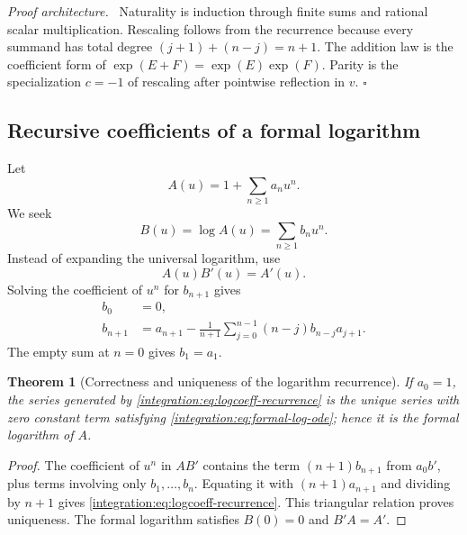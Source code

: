 \documentclass[11pt,oneside]{article}
\newtheorem{theorem}{Theorem}[section]
\theoremstyle{definition}
\theoremstyle{remark}
\newenvironment{proofidea}{\par\smallskip\noindent\textit{Proof architecture.}\ }{\hfill$\square$\par\smallskip}
\begin{document}
\begin{proofidea}
Naturality is induction through finite sums and rational scalar multiplication.
Rescaling follows from the recurrence because every summand has total degree
$(j+1)+(n-j)=n+1$.  The addition law is the coefficient form of
$\exp(E+F)=\exp(E)\exp(F)$.  Parity is the specialization $c=-1$ of rescaling after
pointwise reflection in $v$.
\end{proofidea}

\subsection{Recursive coefficients of a formal logarithm}
\label{integration:sec:log-coeff}

Let
\begin{equation}
 A(u)=1+\sum_{n\ge1}a_nu^n.
 \label{integration:eq:unit-mass-series}
\end{equation}
We seek
\begin{equation}
 B(u)=\log A(u)=\sum_{n\ge1}b_nu^n.
 \label{integration:eq:formal-log-series}
\end{equation}
Instead of expanding the universal logarithm, use
\begin{equation}
 A(u)B'(u)=A'(u).
 \label{integration:eq:formal-log-ode}
\end{equation}
Solving the coefficient of $u^n$ for $b_{n+1}$ gives
\begin{align}
 b_0&=0,                                                     \label{integration:eq:logcoeff-zero}\\
 b_{n+1}&=a_{n+1}-\frac1{n+1}
 \sum_{j=0}^{n-1}(n-j)b_{n-j}a_{j+1}.                      \label{integration:eq:logcoeff-recurrence}
\end{align}
The empty sum at $n=0$ gives $b_1=a_1$.

\begin{theorem}[Correctness and uniqueness of the logarithm recurrence]
\label{integration:thm:logcoeff-correctness}
If $a_0=1$, the series generated by \eqref{integration:eq:logcoeff-recurrence} is the unique series with
zero constant term satisfying \eqref{integration:eq:formal-log-ode}; hence it is the formal logarithm of
$A$.
\end{theorem}

\begin{proof}
The coefficient of $u^n$ in $AB'$ contains the term $(n+1)b_{n+1}$ from $a_0b'$, plus terms
involving only $b_1,\ldots,b_n$.  Equating it with $(n+1)a_{n+1}$ and dividing by $n+1$
gives \eqref{integration:eq:logcoeff-recurrence}.  This triangular relation proves uniqueness.  The
formal logarithm satisfies $B(0)=0$ and $B'A=A'$.
\end{proof}
\end{document}
